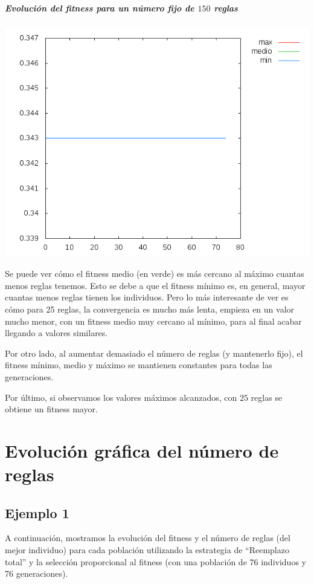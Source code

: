 \documentclass[nochap]{apuntes}
\begin{document}
\paragraph{Evolución del fitness para un número fijo de $150$ reglas}
\begin{center}
\includegraphics[scale=0.6]{tex/img/g75_p75_MejoresPorPeores_SeleccionProporcionalAlFitness_reg150.png}
\end{center}

Se puede ver cómo el fitness medio (en verde) es más cercano al máximo cuantas menos reglas tenemos. Esto se debe a que el fitness mínimo es, en general, mayor cuantas menos reglas tienen los individuos. Pero lo más interesante de ver es cómo para 25 reglas, la convergencia es mucho más lenta, empieza en un valor mucho menor, con un fitness medio muy cercano al mínimo, para al final acabar llegando a valores similares.

Por otro lado, al aumentar demasiado el número de reglas (y mantenerlo fijo), el fitness mínimo, medio y máximo se mantienen constantes para todas las generaciones.

Por último, si observamos los valores máximos alcanzados, con $25$ reglas se obtiene un fitness mayor.


\chapter{Evolución gráfica del número de reglas}
\section{Ejemplo 1}
A continuación, mostramos la evolución del fitness y el número de reglas (del mejor individuo) para cada población utilizando la estrategia de ``Reemplazo total'' y la selección proporcional al fitness (con una población de 76 individuos y 76 generaciones).
\end{document}
